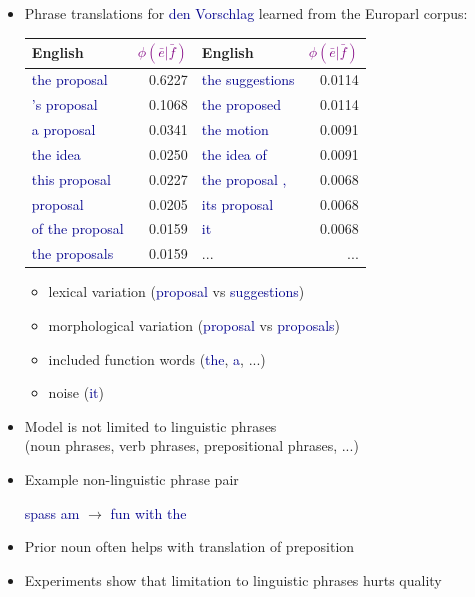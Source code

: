 \documentclass[landscape]{slides}
\newcommand{\example}[1]{\textcolor{darkblue}{\rm #1}}
\newcommand{\maths}[1]{\textcolor{purple}{#1}}
\begin{document}
\begin{itemize}
\item Phrase translations for \example{den Vorschlag}
learned from the Europarl corpus: \vspace{-5mm}
\begin{center}
\begin{tabular}{|l|r||l|r|} \hline
{\bf English} & \maths{$\phi(\bar{e}|\bar{f})$} &
{\bf English} & \maths{$\phi(\bar{e}|\bar{f})$} \\ \hline \hline
\example{the proposal} & 0.6227 &
\example{the suggestions} & 0.0114 \\ \hline
\example{'s proposal} & 0.1068 &
\example{the proposed} & 0.0114 \\ \hline
\example{a proposal} & 0.0341 &
\example{the motion} & 0.0091 \\ \hline
\example{the idea} & 0.0250 &
\example{the idea of} & 0.0091 \\ \hline
\example{this proposal} & 0.0227 &
\example{the proposal ,} & 0.0068 \\ \hline
\example{proposal} & 0.0205 &
\example{its proposal} & 0.0068 \\ \hline
\example{of the proposal} & 0.0159 &
\example{it} & 0.0068 \\ \hline
\example{the proposals} & 0.0159 &
... & ... \\ \hline
\end{tabular}
\end{center}
\begin{itemize}
\item lexical variation (\example{proposal} vs \example{suggestions})
\item morphological variation (\example{proposal} vs \example{proposals})
\item included function words (\example{the}, \example{a}, ...)
\item noise (\example{it})
\end{itemize}
\end{itemize}


\begin{itemize} \vspace{10mm}
\item Model is not limited to linguistic phrases\\ (noun phrases, verb phrases, prepositional phrases, ...)
\item Example non-linguistic phrase pair
\begin{center}
\example{spass am} $\rightarrow$ \example{fun with the}
\end{center}
\item Prior noun often helps with translation of preposition
\item Experiments show that limitation to linguistic phrases hurts quality
\end{itemize}
\end{document}
